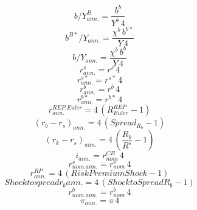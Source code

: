 \begin{dmath}
{ b / Y^B_{ann.} }=\frac{{b^b}}{{Y^b}\, 4}
\end{dmath}
\begin{dmath}
{ b^{B*}/ Y_{ann.} }=\frac{{\chi^b }\, {b^{b*}}}{{Y}\, 4}
\end{dmath}
\begin{dmath}
{b/ Y_{ann.} }=\frac{{\chi^b }\, {b^b}}{{Y}\, 4}
\end{dmath}
\begin{dmath}
{r^s_{ann.}}={r^s}\, 4
\end{dmath}
\begin{dmath}
{r^{s*}_{ann.}}={r^{s*}}\, 4
\end{dmath}
\begin{dmath}
{r^b_{ann.}}={r^b}\, 4
\end{dmath}
\begin{dmath}
{r^{b*}_{ann.}}={r^{b*}}\, 4
\end{dmath}
\begin{dmath}
{ r^{REP.Euler}_{ann.} }=4\, \left({ R^{REP}_{Euler} }-1\right)
\end{dmath}
\begin{dmath}
{ (r_b - r_s)_{ann.} }=4\, \left({Spread_R_b}-1\right)
\end{dmath}
\begin{dmath}
{ (r_k - r_s)_{ann.} }=4\, \left(\frac{{ R_k }}{{R^s}}-1\right)
\end{dmath}
\begin{dmath}
{ i_{ann.}}={ r^{CB}_{nom}}\, 4
\end{dmath}
\begin{dmath}
{ r^s_{nom.ann.}}={ r^s_{nom}}\, 4
\end{dmath}
\begin{dmath}
{ r^{RP}_{ann.}}=4\, \left({ Risk Premium Shock }-1\right)
\end{dmath}
\begin{dmath}
{Shock to spread r_b ann.}=4\, \left({Shock to Spread R_b}-1\right)
\end{dmath}
\begin{dmath}
{ r^b_{nom.ann.}}={ r^b_{nom}}\, 4
\end{dmath}
\begin{dmath}
{ \pi_{ann.} }={ \pi }\, 4
\end{dmath}
